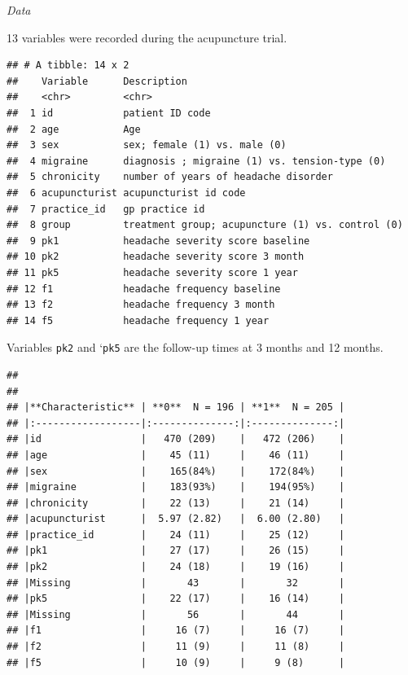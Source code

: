 \documentclass{article}
\begin{document}
\emph{Data}

13 variables were recorded during the acupuncture trial.

\begin{verbatim}
## # A tibble: 14 x 2
##    Variable      Description                                     
##    <chr>         <chr>                                           
##  1 id            patient ID code                                 
##  2 age           Age                                             
##  3 sex           sex; female (1) vs. male (0)                    
##  4 migraine      diagnosis ; migraine (1) vs. tension-type (0)   
##  5 chronicity    number of years of headache disorder            
##  6 acupuncturist acupuncturist id code                           
##  7 practice_id   gp practice id                                  
##  8 group         treatment group; acupuncture (1) vs. control (0)
##  9 pk1           headache severity score baseline                
## 10 pk2           headache severity score 3 month                 
## 11 pk5           headache severity score 1 year                  
## 12 f1            headache frequency baseline                     
## 13 f2            headache frequency 3 month                      
## 14 f5            headache frequency 1 year
\end{verbatim}

Variables \texttt{pk2} and `\texttt{pk5} are the follow-up times at 3
months and 12 months.

\begin{verbatim}
## 
## 
## |**Characteristic** | **0**  N = 196 | **1**  N = 205 |
## |:------------------|:--------------:|:--------------:|
## |id                 |   470 (209)    |   472 (206)    |
## |age                |    45 (11)     |    46 (11)     |
## |sex                |    165(84%)    |    172(84%)    |
## |migraine           |    183(93%)    |    194(95%)    |
## |chronicity         |    22 (13)     |    21 (14)     |
## |acupuncturist      |  5.97 (2.82)   |  6.00 (2.80)   |
## |practice_id        |    24 (11)     |    25 (12)     |
## |pk1                |    27 (17)     |    26 (15)     |
## |pk2                |    24 (18)     |    19 (16)     |
## |Missing            |       43       |       32       |
## |pk5                |    22 (17)     |    16 (14)     |
## |Missing            |       56       |       44       |
## |f1                 |     16 (7)     |     16 (7)     |
## |f2                 |     11 (9)     |     11 (8)     |
## |f5                 |     10 (9)     |     9 (8)      |
\end{verbatim}
\end{document}
